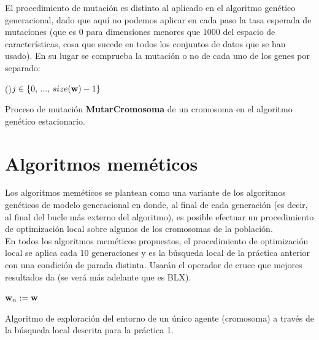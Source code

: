 \documentclass{article}
\newenvironment{algo}{
	\vspace*{0.5cm}
	\begin{algorithm}[H]}{
	\end{algorithm}
	\vspace*{0.5cm}
}
\begin{document}
El procedimiento de mutación es distinto al aplicado en el algoritmo genético generacional, dado que aquí no podemos aplicar en cada paso la tasa esperada de mutaciones (que es $0$ para dimensiones menores que $1000$ del espacio de características, cosa que sucede en todos los conjuntos de datos que se han usado). En su lugar se comprueba la mutación o no de cada uno de los genes por separado: \\

\begin{algo}
	\label{mutar-cr}
	
	\ForEach(){$j \in \{0,\, ...,\, size(\normalfont \textbf w)-1\}$}{
	}
	
	\vspace{0.2cm}
	\caption{Proceso de mutación \textbf{MutarCromosoma} de un cromosoma en el algoritmo genético estacionario.}
\end{algo}

\vspace{-0.2cm}
\section{Algoritmos meméticos}

Los algoritmos meméticos se plantean como una variante de los algoritmos genéticos de modelo generacional en donde, al final de cada generación (es decir, al final del bucle más externo del algoritmo), es posible efectuar un procedimiento de optimización local sobre algunos de los cromosomas de la población. \\

En todos los algoritmos meméticos propuestos, el procedimiento de optimización local se aplica cada $10$ generaciones y es la búsqueda local de la práctica anterior con una condición de parada distinta. Usarán el operador de cruce que mejores resultados da (se verá más adelante que es BLX).

\begin{algo}
	
	$\normalfont \textbf w_n := \normalfont \textbf w$\;
	
	\vspace{0.2cm}
	\caption{Algoritmo de exploración del entorno de un único agente (cromosoma) a través de la búsqueda local descrita para la práctica 1.}
\end{algo}
\end{document}
